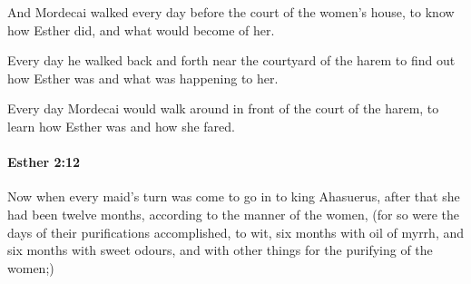 			\begin{versebox}
					\item[BHS] 
					\item[LXX] 
					\item[ASV] And Mordecai walked every day before the court of the women's house, to know how Esther did, and what would become of her.
					\item[NIV] Every day he walked back and forth near the courtyard of the harem to find out how Esther was and what was happening to her.
					\item[NRSV] Every day Mordecai would walk around in front of the court of the harem, to learn how Esther was and how she fared.
			\end{versebox}

		\paragraph{Esther 2:12} %
			\label{ESTHER-2-12}

			Now when every maid’s turn was come to go in to king Ahasuerus, after that she had been twelve months, according to the manner of the women, (for so were the days of their purifications accomplished, to wit, six months with oil of myrrh, and six months with sweet odours, and with other things for the purifying of the women;)

